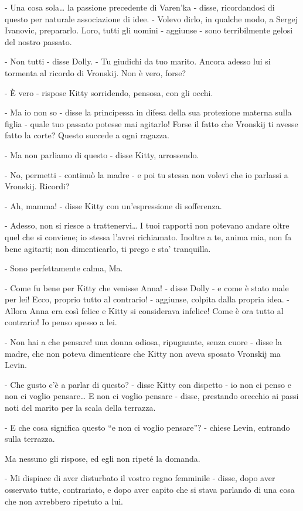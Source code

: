 - Una cosa sola\ldots{} la passione precedente di Varen'ka - disse, ricordandosi di questo per naturale associazione di idee. - Volevo dirlo, in qualche modo, a Sergej Ivanovic, prepararlo. Loro, tutti gli uomini - aggiunse - sono terribilmente gelosi del nostro passato. 

- Non tutti - disse Dolly. - Tu giudichi da tuo marito. Ancora adesso lui si tormenta al ricordo di Vronskij. Non è vero, forse? 

- È vero - rispose Kitty sorridendo, pensosa, con gli occhi. 

- Ma io non so - disse la principessa in difesa della sua protezione materna sulla figlia - quale tuo passato potesse mai agitarlo! Forse il fatto che Vronskij ti avesse fatto la corte? Questo succede a ogni ragazza. 

- Ma non parliamo di questo - disse Kitty, arrossendo. 

- No, permetti - continuò la madre - e poi tu stessa non volevi che io parlassi a Vronskij. Ricordi? 

- Ah, mamma! - disse Kitty con un'espressione di sofferenza. 

- Adesso, non si riesce a trattenervi\ldots{} I tuoi rapporti non potevano andare oltre quel che si conviene; io stessa l'avrei richiamato. Inoltre a te, anima mia, non fa bene agitarti; non dimenticarlo, ti prego e sta' tranquilla. 

- Sono perfettamente calma, Ma. 

- Come fu bene per Kitty che venisse Anna! - disse Dolly - e come è stato male per lei! Ecco, proprio tutto al contrario! - aggiunse, colpita dalla propria idea. - Allora Anna era così felice e Kitty si considerava infelice! Come è ora tutto al contrario! Io penso spesso a lei. 

- Non hai a che pensare! una donna odiosa, ripugnante, senza cuore - disse la madre, che non poteva dimenticare che Kitty non aveva sposato Vronskij ma Levin. 

- Che gusto c'è a parlar di questo? - disse Kitty con dispetto - io non ci penso e non ci voglio pensare\ldots{} E non ci voglio pensare - disse, prestando orecchio ai passi noti del marito per la scala della terrazza. 

- E che cosa significa questo ``e non ci voglio pensare''? - chiese Levin, entrando sulla terrazza. 

Ma nessuno gli rispose, ed egli non ripeté la domanda. 

- Mi dispiace di aver disturbato il vostro regno femminile - disse, dopo aver osservato tutte, contrariato, e dopo aver capito che si stava parlando di una cosa che non avrebbero ripetuto a lui. 

